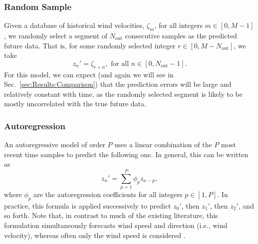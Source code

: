 \documentclass[11pt, oneside]{article}
\newcommand{\secref}[1]{Sec.~\ref{#1}}
\begin{document}
\subsubsection{Random Sample}
Given a database of historical wind velocities, $\zeta_m$, for all integers $m \in [0, M-1]$, we randomly select a segment of $N_\text{out}$ consecutive samples as the predicted future data.
That is, for some randomly selected integer $r \in [0, M - N_\text{out}]$, we take
\begin{equation}
z_n' = \zeta_{r+n}, \text{ for all } n \in [0, N_\text{out} - 1].
\end{equation}
For this model, we can expect (and again we will see in \secref{sec:Results:Comparison}) that the prediction errors will be large and relatively constant with time, as the randomly selected segment is likely to be mostly uncorrelated with the true future data.

\subsubsection{Autoregression}\label{sec:Models:Autoregression}
An autoregressive model of order $P$ uses a linear combination of the $P$ most recent time samples to predict the following one.
In general, this can be written as
\begin{equation}
z_n' = \sum_{p = 1}^P \phi_p z_{n-p},
\end{equation}
where $\phi_p$ are the autoregression coefficients for all integers $p \in [1, P]$.
In practice, this formula is applied successively to predict $z_0'$, then $z_1'$, then $z_2'$, and so forth.
Note that, in contrast to much of the existing literature, this formulation simultaneously forecasts wind speed and direction (i.e., wind velocity), whereas often only the wind speed is considered \citep[for example]{Brown1984}.
\end{document}
